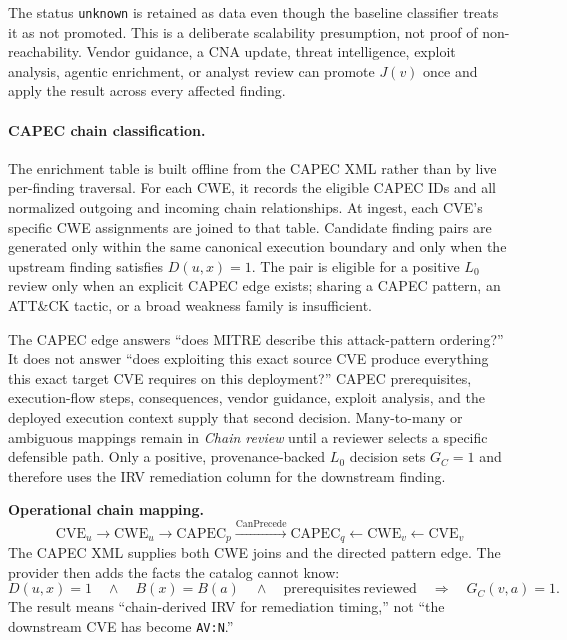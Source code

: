 \documentclass[11pt]{article}
\newcommand{\code}[1]{\texttt{#1}}
\begin{document}
The status \code{unknown} is retained as data even though the baseline
classifier treats it as not promoted. This is a deliberate scalability
presumption, not proof of non-reachability. Vendor guidance, a CNA update,
threat intelligence, exploit analysis, agentic enrichment, or analyst review
can promote $J(v)$ once and apply the result across every affected finding.

\paragraph{CAPEC chain classification.}
The enrichment table is built offline from the CAPEC XML rather than by live
per-finding traversal. For each CWE, it records the eligible CAPEC IDs and all
normalized outgoing and incoming chain relationships. At ingest, each CVE's
specific CWE assignments are joined to that table. Candidate finding pairs are
generated only within the same canonical execution boundary and only when the
upstream finding satisfies $D(u,x)=1$. The pair is eligible for a positive
$L_0$ review only when an explicit CAPEC edge exists; sharing a CAPEC pattern,
an ATT\&CK tactic, or a broad weakness family is insufficient.

The CAPEC edge answers ``does MITRE describe this attack-pattern ordering?''
It does not answer ``does exploiting this exact source CVE produce everything
this exact target CVE requires on this deployment?'' CAPEC prerequisites,
execution-flow steps, consequences, vendor guidance, exploit analysis, and the
deployed execution context supply that second decision. Many-to-many or
ambiguous mappings remain in \emph{Chain review} until a reviewer selects a
specific defensible path. Only a positive, provenance-backed $L_0$ decision
sets $G_C=1$ and therefore uses the IRV remediation column for the downstream
finding.

\begin{keybox}
\textbf{Operational chain mapping.}
\[
\mathrm{CVE}_u\rightarrow\mathrm{CWE}_u\rightarrow\mathrm{CAPEC}_p
\xrightarrow{\mathrm{CanPrecede}}
\mathrm{CAPEC}_q\leftarrow\mathrm{CWE}_v\leftarrow\mathrm{CVE}_v
\]
The CAPEC XML supplies both CWE joins and the directed pattern edge. The
provider then adds the facts the catalog cannot know:
\[
D(u,x)=1\quad\land\quad B(x)=B(a)\quad\land\quad
\mathrm{prerequisites\ reviewed}\quad\Longrightarrow\quad G_C(v,a)=1.
\]
The result means ``chain-derived IRV for remediation timing,'' not ``the
downstream CVE has become \code{AV:N}.''
\end{keybox}
\end{document}
